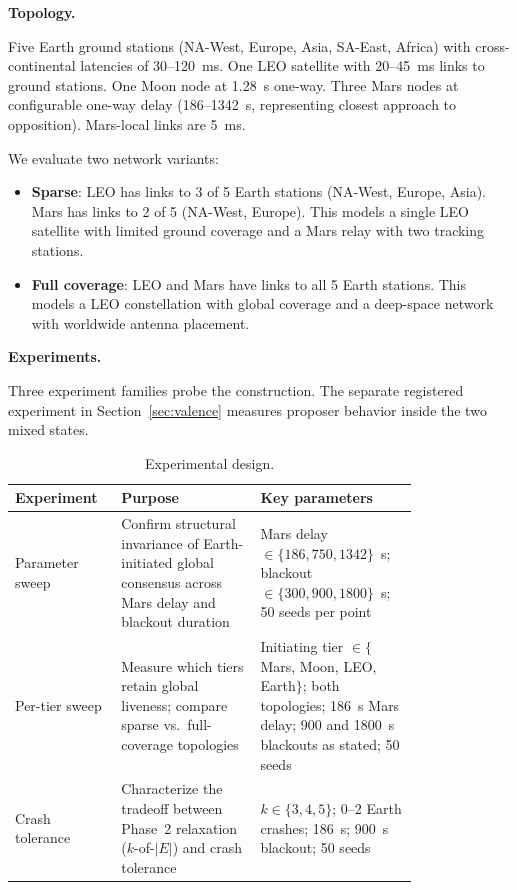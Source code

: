 \documentclass[letterpaper,twocolumn,10pt]{article}
\newcounter{prop}
\begin{document}
\textbf{Topology.}

Five Earth ground stations (NA-West, Europe, Asia, SA-East, Africa) with cross-continental latencies of 30--120~ms. One LEO satellite with 20--45~ms links to ground stations. One Moon node at 1.28~s one-way. Three Mars nodes at configurable one-way delay (186--1342~s, representing closest approach to opposition). Mars-local links are 5~ms.

We evaluate two network variants:
\begin{itemize}
\item \textbf{Sparse}: LEO has links to 3 of 5 Earth stations (NA-West, Europe, Asia). Mars has links to 2 of 5 (NA-West, Europe). This models a single LEO satellite with limited ground coverage and a Mars relay with two tracking stations.
\item \textbf{Full coverage}: LEO and Mars have links to all 5 Earth stations. This models a LEO constellation with global coverage and a deep-space network with worldwide antenna placement.
\end{itemize}

\textbf{Experiments.}

Three experiment families probe the construction. The separate registered experiment in Section~\ref{sec:valence} measures proposer behavior inside the two mixed states.

\begin{table}[t]
\centering
\small
\caption{Experimental design.}
\label{tab:design}
\footnotesize
\begin{tabular}{>{\raggedright\arraybackslash}p{0.16\linewidth}>{\raggedright\arraybackslash}p{0.30\linewidth}>{\raggedright\arraybackslash}p{0.34\linewidth}}
\toprule
Experiment & Purpose & Key parameters \\
\midrule
Parameter sweep & Confirm structural invariance of Earth-initiated global consensus across Mars delay and blackout duration & Mars delay $\in \{186, 750, 1342\}$~s; blackout $\in \{300, 900, 1800\}$~s; 50 seeds per point \\
Per-tier sweep & Measure which tiers retain global liveness; compare sparse vs.\ full-coverage topologies & Initiating tier $\in \{$Mars, Moon, LEO, Earth$\}$; both topologies; 186~s Mars delay; 900 and 1800~s blackouts as stated; 50 seeds \\
Crash tolerance & Characterize the tradeoff between Phase~2 relaxation ($k$-of-$|E|$) and crash tolerance & $k \in \{3, 4, 5\}$; 0--2 Earth crashes; 186~s; 900~s blackout; 50 seeds \\
\bottomrule
\end{tabular}
\end{table}
\end{document}
